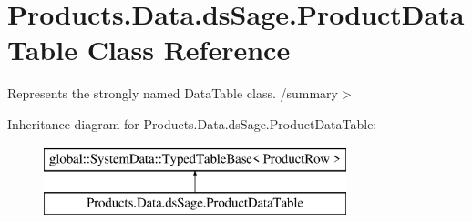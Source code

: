 \hypertarget{class_products_1_1_data_1_1ds_sage_1_1_product_data_table}{}\section{Products.\+Data.\+ds\+Sage.\+Product\+Data\+Table Class Reference}
\label{class_products_1_1_data_1_1ds_sage_1_1_product_data_table}


Represents the strongly named Data\+Table class. /summary$>$  


Inheritance diagram for Products.\+Data.\+ds\+Sage.\+Product\+Data\+Table\+:\begin{figure}[H]
\begin{center}
\leavevmode
\includegraphics[height=2.000000cm]{class_products_1_1_data_1_1ds_sage_1_1_product_data_table}
\end{center}
\end{figure}
